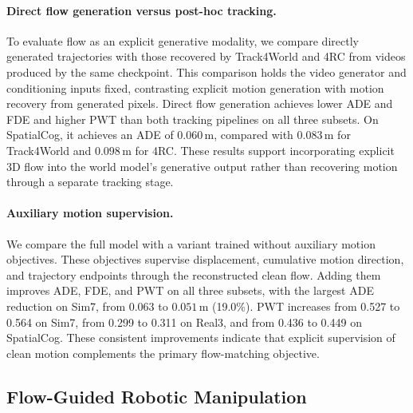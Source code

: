 \paragraph{Direct flow generation versus post-hoc tracking.}
To evaluate flow as an explicit generative modality,
we compare directly generated trajectories with those
recovered by Track4World and 4RC from videos produced
by the same \method{} checkpoint.
This comparison holds the video generator and conditioning
inputs fixed, contrasting explicit motion generation
with motion recovery from generated pixels.
Direct flow generation achieves lower ADE and FDE
and higher PWT than both tracking pipelines on all
three subsets.
On SpatialCog, it achieves an ADE of $0.060\,\mathrm{m}$,
compared with $0.083\,\mathrm{m}$ for Track4World and
$0.098\,\mathrm{m}$ for 4RC.
These results support incorporating explicit 3D flow
into the world model's generative output rather than
recovering motion through a separate tracking stage.

\paragraph{Auxiliary motion supervision.}
We compare the full model with a variant trained without
auxiliary motion objectives.
These objectives supervise displacement, cumulative
motion direction, and trajectory endpoints through
the reconstructed clean flow.
Adding them improves ADE, FDE, and PWT on all three
subsets, with the largest ADE reduction on Sim7,
from $0.063$ to $0.051\,\mathrm{m}$ (19.0\%).
PWT increases from 0.527 to 0.564 on Sim7,
from 0.299 to 0.311 on Real3, and from 0.436 to 0.449
on SpatialCog.
These consistent improvements indicate that explicit
supervision of clean motion complements the primary
flow-matching objective.



% 

\subsection{Flow-Guided Robotic Manipulation}
\label{sec:real_robot}

